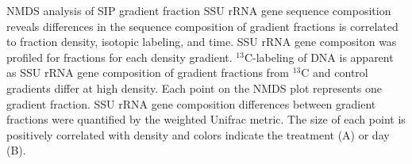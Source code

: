 NMDS analysis of SIP gradient fraction SSU rRNA gene sequence composition reveals
differences in the sequence composition of gradient fractions is correlated to
fraction density, isotopic labeling, and time. SSU rRNA gene compositon was
profiled for fractions for each density gradient. $^{13}$C-labeling of DNA is
apparent as SSU rRNA gene composition of gradient fractions from $^{13}$C and
control gradients differ at high density. Each point on the NMDS plot
represents one gradient fraction. SSU rRNA gene composition differences
between gradient fractions were quantified by the weighted Unifrac metric. The
size of each point is positively correlated with density and colors indicate
the treatment (A) or day (B).
